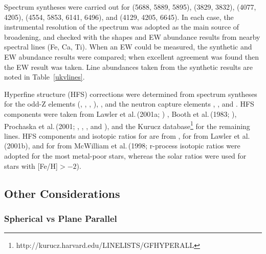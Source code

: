 \documentclass{emulateapj}
\newcommand\etal{{\rm et al.\,}}
\begin{document}
Spectrum syntheses were carried out for  (5688, 5889, 5895),
 (3829, 3832),  (4077, 4205), 
 (4554, 5853, 6141, 6496), and  (4129, 4205, 6645).  
In each case, the instrumental resolution of the spectrum was adopted as 
the main source of broadening, and checked with the shapes and EW abundance
results from nearby spectral lines (Fe, Ca, Ti).     When an EW could 
be measured, the synthetic and EW abundance results were compared; when
excellent agreement was found then the EW result was taken.   Line
abundances taken from the synthetic results are noted in Table~\ref{ukvlines}. 

Hyperfine structure (HFS) corrections were determined from spectrum 
syntheses for  
the odd-Z elements (, , , ),
, and the neutron capture elements 
, , and .
HFS components were taken from Lawler \etal (2001a; ) , 
Booth \etal (1983; ), 
Prochaska \etal (2001; , , ,
and ), and the Kurucz 
database\footnote{http://kurucz.harvard.edu/LINELISTS/GFHYPERALL}
for the remaining lines.   
HFS components and isotopic ratios for  
are from \citet{Beh76}, for  from Lawler \etal (2001b), 
and for  from McWilliam \etal (1998; r-process isotopic 
ratios were adopted for the most metal-poor stars, whereas the 
solar ratios were used for stars with [Fe/H]$>-2$). 



\subsection{Other Considerations}

\subsubsection{Spherical vs Plane Parallel \label{sphere}}  
\end{document}

